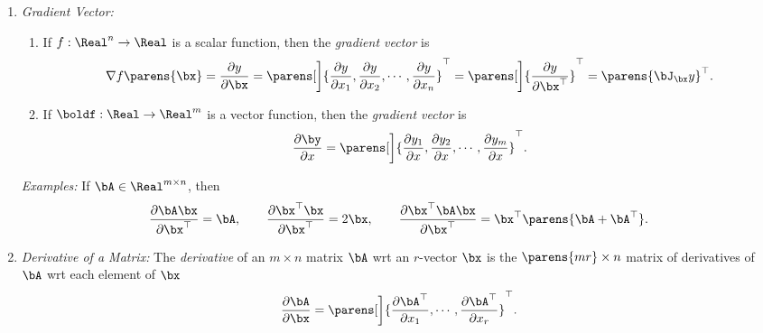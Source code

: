 \documentclass[12pt]{article}
\begin{document}
\begin{enumerate}[label=\textbf{\arabic*.}]
\begin{enumerate}
		\item \textit{Gradient Vector:} 
		\begin{enumerate}
			\item If $f: \Real^n \to \Real$ is a scalar function, then the \textit{gradient vector} is 
			\begin{align*}
				\nabla f \parens{\bx} = \frac{\partial y}{\partial \bx} = \parens[\bigg]{\frac{\partial y}{\partial x_1}, \frac{\partial y}{\partial x_2}, \cdots, \frac{\partial y}{\partial x_n}}^\top = \parens[\bigg]{\frac{\partial y}{\partial \bx^\top}}^\top = \parens{\bJ_{\bx} y}^\top. 
			\end{align*}
			
			\item If $\boldf: \Real \to \Real^m$ is a vector function, then the \textit{gradient vector} is 
			\begin{align*}
				\frac{\partial \by}{\partial x} = \parens[\bigg]{\frac{\partial y_1}{\partial x}, \frac{\partial y_2}{\partial x}, \cdots, \frac{\partial y_m}{\partial x}}^\top. 
			\end{align*}
		\end{enumerate}
		
		\textit{Examples:} If $\bA \in \Real^{m \times n}$, then 
		\begin{align*}
			\frac{\partial \bA \bx}{\partial \bx^\top} = \bA, \hspace{20pt} \frac{\partial \bx^\top \bx}{\partial \bx^\top} = 2\bx, \hspace{20pt} \frac{\partial \bx^\top\bA\bx}{\partial \bx^\top} = \bx^\top \parens{\bA+\bA^\top}. 
		\end{align*}
		
		\item \textit{Derivative of a Matrix:} The \textit{derivative} of an $m \times n$ matrix $\bA$ wrt an $r$-vector $\bx$ is the $ \parens{mr} \times n$ matrix of derivatives of $\bA$ wrt each element of $\bx$ 
		\begin{align*}
			\frac{\partial \bA}{\partial \bx} = \parens[\bigg]{\frac{\partial \bA^\top}{\partial x_1}, \cdots, \frac{\partial \bA^\top}{\partial x_r}}^\top. 
		\end{align*}
		

\end{enumerate}
\end{enumerate}
\end{document}
